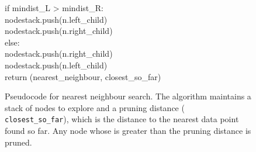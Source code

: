 \begin{figure}
\begin{pcode}
\>\>\>         if mindist\_L > mindist\_R: \\
\>\>\>\>            nodestack.push(n.left\_child) \\
\>\>\>\>            nodestack.push(n.right\_child) \\
\>\>\>         else: \\
\>\>\>\>            nodestack.push(n.right\_child) \\
\>\>\>\>            nodestack.push(n.left\_child) \\
\>   return (nearest\_neighbour, closest\_so\_far)
\end{pcode}
\caption{Pseudocode for nearest neighbour search.  The algorithm maintains
a stack of nodes to explore and a pruning distance ({\tt
closest\_so\_far}), which is the distance to the nearest data point
found so far.  Any node whose
\mindist is greater than the pruning distance is pruned.}
\label{code:nn}
\end{figure}




